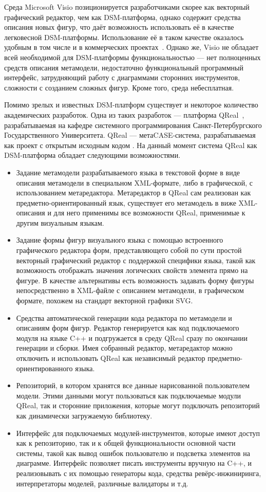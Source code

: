 \documentclass[a4paper]{article}
\begin{document}
Среда Microsoft Visio позиционируется разработчиками скорее как векторный графический редактор, чем как DSM-платформа, однако содержит средства описания новых фигур, что даёт возможность использовать её в качестве легковесной DSM-платформы. Использование её в таком качестве оказалось удобным в том числе и в коммерческих проектах~\cite{videoDsl}. Однако же, Visio не обладает всей необходимой для DSM-платформы функциональностью --- нет полноценных средств описания метамодели, недостаточно функциональный программный интерфейс, затрудняющий работу с диаграммами сторонних инструментов, сложности с созданием сложных фигур. Кроме того, среда небесплатная.

Помимо зрелых и известных DSM-платформ существует и некоторое количество академических разработок. Одна из таких разработок --- платформа QReal~\cite{qReal}, разрабатываемая на кафедре системного программирования Санкт-Петербургского Государственного Университета. QReal --- метаCASE-система, разрабатываемая как проект с открытым исходным кодом \cite{qRealGithub}. На данный момент система QReal как DSM-платформа обладает следующими возможностями.
\begin{itemize}
  \item Задание метамодели разрабатываемого языка в текстовой форме в виде описания метамодели в специальном XML-формате, либо в графической, с использованием метаредактора. Метаредактор в QReal сам реализован как предметно-ориентированный язык, существует его метамодель в виже XML-описания и для него применимы все возможности QReal, применимые к другим визуальным языкам.
  \item Задание формы фигур визуального языка с помощью встроенного графического редактора форм, представляющего собой по сути простой векторный графический редактор с поддержкой специфики языка, такой как возможность отображать значения логических свойств элемента прямо на фигуре. В качестве альтернативы есть возможность задавать форму фигуры непосредственно в XML-файле с описанием метамодели, в графическом формате, похожем на стандарт векторной графики SVG.
  \item Средства автоматической генерации кода редактора по метамодели и описаниям форм фигур. Редактор генерируется как код подключаемого модуля на языке C++ и подгружается в среду QReal сразу по окончании генерации и сборки. Имея собранный редактор, метаредактор можно отключить и использовать QReal как независимый редактор предметно-ориентированного языка.
  \item Репозиторий, в котором хранятся все данные нарисованной пользователем модели. Этими данными могут пользоваться как подключаемые модули QReal, так и сторонние приложения, которые могут подключать репозиторий как динамически загружаемую библиотеку.
  \item Интерфейс для подключаемых модулей-инструментов, которые имеют доступ как к репозиторию, так и к общей функциональности основной части системы, такой как вывод ошибок пользователю и подсветка элементов на диаграмме. Интерфейс позволяет писать инструменты вручную на C++, и реализовывать с их помощью генераторы кода, средства ревёрс-инжиниринга, интерпретаторы моделей, различные валидаторы и т.д.
\end{itemize}
\end{document}
